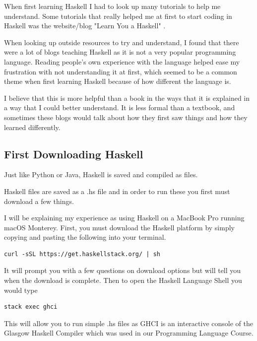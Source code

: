 \documentclass{article}
\begin{document}
\medskip\noindent
When first learning Haskell I had to look up many tutorials to help me understand. Some tutorials that really helped me at first to start coding in Haskell was the website/blog "Learn You a Haskell" \cite{LH}. 

\medskip\noindent
When looking up outside resources to try and understand, I found that there were a lot of blogs teaching Haskell as it is not a very popular programming language. Reading people's own experience with the language helped ease my frustration with not understanding it at first, which seemed to be a common theme when first learning Haskell because of how different the language is. 

\medskip\noindent
I believe that this is more helpful than a book in the ways that it is explained in a way that I could better understand. It is less formal than a textbook, and sometimes these blogs would talk about how they first saw things and how they learned differently. 

\subsection{First Downloading Haskell}

Just like Python or Java, Haskell is saved and compiled as files. 

\medskip\noindent
Haskell files are saved as a .hs file and in order to run these you first must download a few things. 

\medskip\noindent
I will be explaining my experience as using Haskell on a MacBook Pro running macOS Monterey. First, you must download the Haskell platform by simply copying and pasting the following into your terminal. 

\medskip\noindent
\begin{lstlisting}
curl -sSL https://get.haskellstack.org/ | sh
\end{lstlisting}

\medskip\noindent
It will prompt you with a few questions on download options but will tell you when the download is complete. Then to open the Haskell Language Shell you would type

\medskip\noindent
\begin{lstlisting}
stack exec ghci
\end{lstlisting}

\medskip\noindent
This will allow you to run simple .hs files as GHCI is an interactive console of the Glasgow Haskell Compiler which was used in our Programming Language Course.\cite{PLIN}
\end{document}
